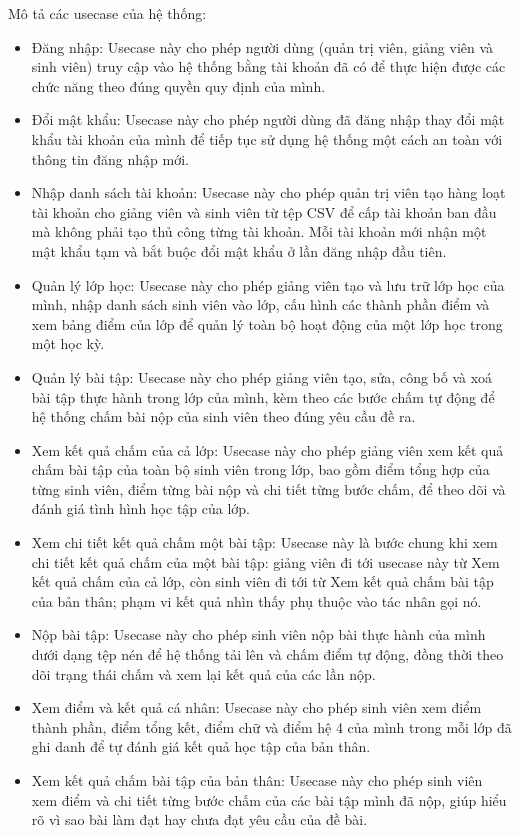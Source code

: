 \documentclass[../BTL.tex]{subfiles}
\begin{document}
Mô tả các usecase của hệ thống:
\begin{itemize}
    \item Đăng nhập: Usecase này cho phép người dùng (quản trị viên, giảng viên và sinh viên) truy cập vào hệ thống bằng tài khoản đã có để thực hiện được các chức năng theo đúng quyền quy định của mình.
    \item Đổi mật khẩu: Usecase này cho phép người dùng đã đăng nhập thay đổi mật khẩu tài khoản của mình để tiếp tục sử dụng hệ thống một cách an toàn với thông tin đăng nhập mới.
    \item Nhập danh sách tài khoản: Usecase này cho phép quản trị viên tạo hàng loạt tài khoản cho giảng viên và sinh viên từ tệp CSV để cấp tài khoản ban đầu mà không phải tạo thủ công từng tài khoản. Mỗi tài khoản mới nhận một mật khẩu tạm và bắt buộc đổi mật khẩu ở lần đăng nhập đầu tiên.
    \item Quản lý lớp học: Usecase này cho phép giảng viên tạo và lưu trữ lớp học của mình, nhập danh sách sinh viên vào lớp, cấu hình các thành phần điểm và xem bảng điểm của lớp để quản lý toàn bộ hoạt động của một lớp học trong một học kỳ.
    \item Quản lý bài tập: Usecase này cho phép giảng viên tạo, sửa, công bố và xoá bài tập thực hành trong lớp của mình, kèm theo các bước chấm tự động để hệ thống chấm bài nộp của sinh viên theo đúng yêu cầu đề ra.
    \item Xem kết quả chấm của cả lớp: Usecase này cho phép giảng viên xem kết quả chấm bài tập của toàn bộ sinh viên trong lớp, bao gồm điểm tổng hợp của từng sinh viên, điểm từng bài nộp và chi tiết từng bước chấm, để theo dõi và đánh giá tình hình học tập của lớp.
    \item Xem chi tiết kết quả chấm một bài tập: Usecase này là bước chung khi xem chi tiết kết quả chấm của một bài tập: giảng viên đi tới usecase này từ Xem kết quả chấm của cả lớp, còn sinh viên đi tới từ Xem kết quả chấm bài tập của bản thân; phạm vi kết quả nhìn thấy phụ thuộc vào tác nhân gọi nó.
    \item Nộp bài tập: Usecase này cho phép sinh viên nộp bài thực hành của mình dưới dạng tệp nén để hệ thống tải lên và chấm điểm tự động, đồng thời theo dõi trạng thái chấm và xem lại kết quả của các lần nộp.
    \item Xem điểm và kết quả cá nhân: Usecase này cho phép sinh viên xem điểm thành phần, điểm tổng kết, điểm chữ và điểm hệ 4 của mình trong mỗi lớp đã ghi danh để tự đánh giá kết quả học tập của bản thân.
    \item Xem kết quả chấm bài tập của bản thân: Usecase này cho phép sinh viên xem điểm và chi tiết từng bước chấm của các bài tập mình đã nộp, giúp hiểu rõ vì sao bài làm đạt hay chưa đạt yêu cầu của đề bài.

\end{itemize}
\end{document}
